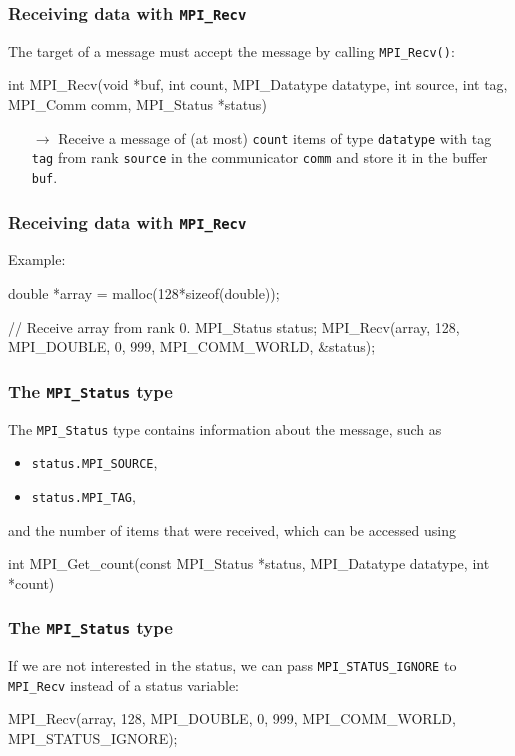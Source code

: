 \documentclass[12pt,t]{beamer}
\newcommand{\conclude}[1]{%
  \begin{itemize}
    \item[$\rightarrow$]#1
  \end{itemize}
}
\begin{document}
  \begin{frame}[fragile]
    \frametitle{Receiving data with \texttt{MPI\_Recv}}

    The target of a message must accept the message by calling \texttt{MPI\_Recv()}:
    \begin{code}
int MPI_Recv(void *buf,
             int count,
             MPI_Datatype datatype,
             int source,
             int tag,
             MPI_Comm comm,
             MPI_Status *status)
    \end{code}
    \conclude{Receive a message of (at most) \texttt{count} items of type \texttt{datatype} with tag \texttt{tag} from rank \texttt{source} in the communicator \texttt{comm} and store it in the buffer \texttt{buf}.}
  \end{frame}

  \begin{frame}[fragile]
    \frametitle{Receiving data with \texttt{MPI\_Recv}}

    Example:
    \begin{code}
double *array = malloc(128*sizeof(double));

// Receive array from rank 0.
MPI_Status status;
MPI_Recv(array,
         128,
         MPI_DOUBLE,
         0,
         999,
         MPI_COMM_WORLD,
         &status);
    \end{code}
  \end{frame}

  \begin{frame}[fragile]
    \frametitle{The \texttt{MPI\_Status} type}

    The \texttt{MPI\_Status} type contains information about the message, such as
    \begin{itemize}
      \item \texttt{status.MPI\_SOURCE},
      \item \texttt{status.MPI\_TAG},
    \end{itemize}
    and the number of items that were received, which can be accessed using
    \begin{code}
int MPI_Get_count(const MPI_Status *status,
                  MPI_Datatype datatype,
                  int *count)
    \end{code}
  \end{frame}

  \begin{frame}[fragile]
    \frametitle{The \texttt{MPI\_Status} type}

    If we are not interested in the status, we can pass \texttt{MPI\_STATUS\_IGNORE} to \texttt{MPI\_Recv} instead of a status variable:

    \begin{code}
MPI_Recv(array,
         128,
         MPI_DOUBLE,
         0,
         999,
         MPI_COMM_WORLD,
         MPI_STATUS_IGNORE);
    \end{code}
  \end{frame}
\end{document}
